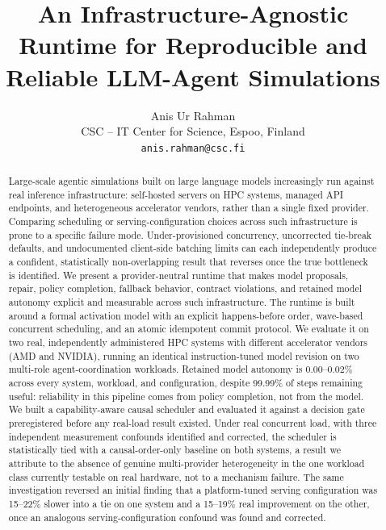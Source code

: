 \documentclass[11pt,a4paper]{article}
\title{An Infrastructure-Agnostic Runtime for Reproducible and Reliable LLM-Agent Simulations}
\author{Anis Ur Rahman \\[2pt] \small CSC -- IT Center for Science, Espoo, Finland \\[-2pt] \small \texttt{anis.rahman@csc.fi}}
\date{}
\begin{document}
\maketitle

\begin{abstract}
Large-scale agentic simulations built on large language models increasingly run against real inference infrastructure: self-hosted servers on HPC systems, managed API endpoints, and heterogeneous accelerator vendors, rather than a single fixed provider. Comparing scheduling or serving-configuration choices across such infrastructure is prone to a specific failure mode. Under-provisioned concurrency, uncorrected tie-break defaults, and undocumented client-side batching limits can each independently produce a confident, statistically non-overlapping result that reverses once the true bottleneck is identified. We present a provider-neutral runtime that makes model proposals, repair, policy completion, fallback behavior, contract violations, and retained model autonomy explicit and measurable across such infrastructure. The runtime is built around a formal activation model with an explicit happens-before order, wave-based concurrent scheduling, and an atomic idempotent commit protocol. We evaluate it on two real, independently administered HPC systems with different accelerator vendors (AMD and NVIDIA), running an identical instruction-tuned model revision on two multi-role agent-coordination workloads. Retained model autonomy is 0.00--0.02\% across every system, workload, and configuration, despite 99.99\% of steps remaining useful: reliability in this pipeline comes from policy completion, not from the model. We built a capability-aware causal scheduler and evaluated it against a decision gate preregistered before any real-load result existed. Under real concurrent load, with three independent measurement confounds identified and corrected, the scheduler is statistically tied with a causal-order-only baseline on both systems, a result we attribute to the absence of genuine multi-provider heterogeneity in the one workload class currently testable on real hardware, not to a mechanism failure. The same investigation reversed an initial finding that a platform-tuned serving configuration was 15--22\% slower into a tie on one system and a 15--19\% real improvement on the other, once an analogous serving-configuration confound was found and corrected.
\end{abstract}












\end{document}
